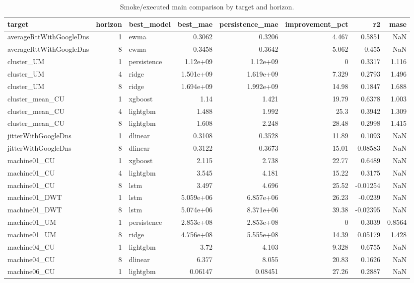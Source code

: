 \begin{table}
\caption{Smoke/executed main comparison by target and horizon.}
\label{tab:main}
\begin{tabular}{lrlrrrrr}
\toprule
target & horizon & best_model & best_mae & persistence_mae & improvement_pct & r2 & mase \\
\midrule
averageRttWithGoogleDns & 1 & ewma & 0.3062 & 0.3206 & 4.467 & 0.5851 & NaN \\
averageRttWithGoogleDns & 8 & ewma & 0.3458 & 0.3642 & 5.062 & 0.455 & NaN \\
cluster_UM & 1 & persistence & 1.12e+09 & 1.12e+09 & 0 & 0.3317 & 1.116 \\
cluster_UM & 4 & ridge & 1.501e+09 & 1.619e+09 & 7.329 & 0.2793 & 1.496 \\
cluster_UM & 8 & ridge & 1.694e+09 & 1.992e+09 & 14.98 & 0.1847 & 1.688 \\
cluster_mean_CU & 1 & xgboost & 1.14 & 1.421 & 19.79 & 0.6378 & 1.003 \\
cluster_mean_CU & 4 & lightgbm & 1.488 & 1.992 & 25.3 & 0.3942 & 1.309 \\
cluster_mean_CU & 8 & lightgbm & 1.608 & 2.248 & 28.48 & 0.2998 & 1.415 \\
jitterWithGoogleDns & 1 & dlinear & 0.3108 & 0.3528 & 11.89 & 0.1093 & NaN \\
jitterWithGoogleDns & 8 & dlinear & 0.3122 & 0.3673 & 15.01 & 0.08583 & NaN \\
machine01_CU & 1 & xgboost & 2.115 & 2.738 & 22.77 & 0.6489 & NaN \\
machine01_CU & 4 & lightgbm & 3.545 & 4.181 & 15.22 & 0.3175 & NaN \\
machine01_CU & 8 & lstm & 3.497 & 4.696 & 25.52 & -0.01254 & NaN \\
machine01_DWT & 1 & lstm & 5.059e+06 & 6.857e+06 & 26.23 & -0.0239 & NaN \\
machine01_DWT & 8 & lstm & 5.074e+06 & 8.371e+06 & 39.38 & -0.02395 & NaN \\
machine01_UM & 1 & persistence & 2.853e+08 & 2.853e+08 & 0 & 0.3039 & 0.8564 \\
machine01_UM & 8 & ridge & 4.756e+08 & 5.555e+08 & 14.39 & 0.05179 & 1.428 \\
machine04_CU & 1 & lightgbm & 3.72 & 4.103 & 9.328 & 0.6755 & NaN \\
machine04_CU & 8 & dlinear & 6.377 & 8.055 & 20.83 & 0.1626 & NaN \\
machine06_CU & 1 & lightgbm & 0.06147 & 0.08451 & 27.26 & 0.2887 & NaN \\

\end{tabular}
\end{table}
